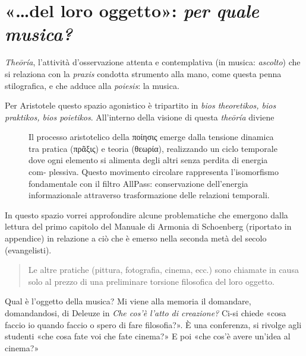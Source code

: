 \section{«\ldots del loro oggetto»: \emph{per quale musica?}}

\emph{Theōría}, l'attività d'osservazione attenta e contemplativa (in musica:
\emph{ascolto}) che si relaziona con la \emph{praxis} condotta strumento alla
mano, come questa penna stilografica, e che adduce alla \emph{poiesis}: la musica.

Per Aristotele questo spazio agonistico è tripartito in \emph{bios theoretikos,
bios praktikos, bios poietikos}. All'interno della visione di questa
\emph{theōría} diviene

\begin{figure}[htbp]
\begin{center}
\caption{Il processo aristotelico della ποίησις emerge dalla tensione dinamica
tra pratica (πρᾶξις) e teoria (θεωρία), realizzando un ciclo temporale dove ogni
elemento si alimenta degli altri senza perdita di energia com- plessiva. Questo
movimento circolare rappresenta l’isomorfismo fondamentale con il filtro AllPass:
conservazione dell’energia informazionale attraverso trasformazione delle
relazioni temporali.}
\label{poiesis}
\end{center}
\end{figure}

In questo spazio vorrei approfondire alcune problematiche che emergono dalla lettura del primo capitolo del Manuale di Armonia di Schoenberg (riportato in appendice) \cite{schonberg1970} in relazione a ciò che è emerso nella seconda metà del secolo (evangelisti).

\begin{quote}
\begin{sf}
\small
  Le altre pratiche (pittura, fotografia, cinema, ecc.) sono chiamate in causa
  solo al prezzo di una preliminare torsione filosofica del loro oggetto.
  \cite{ronchi2001}
  \end{sf}
\end{quote}

Qual è l'oggetto della musica? Mi viene alla memoria il domandare, domandandosi,
di Deleuze in \emph{Che cos'è l'atto di creazione?} \cite{deleuze2009} Ci-si
chiede «cosa faccio io quando faccio o spero di fare filosofia?». È una
conferenza, si rivolge agli studenti «che cosa fate voi che fate cinema?» E poi
«che cos'è avere un'idea al cinema?»

